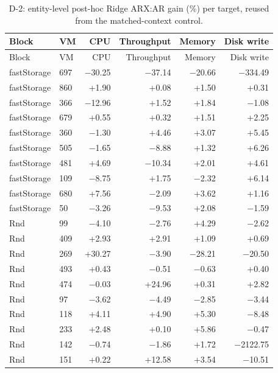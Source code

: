 \documentclass[a4paper,11pt]{article}
\begin{document}
\normalsize\setlength{\tabcolsep}{4pt}
\small
\setlength{\tabcolsep}{3pt}
\begin{longtable}{@{}llrrrr@{}}
\caption{D-2: entity-level post-hoc Ridge ARX:AR gain (\%) per target, reused from the matched-context control.}\label{tab:supp-t2-d2}\\
\toprule
Block & VM & CPU & Throughput & Memory & Disk write \\
\midrule
\endfirsthead
\toprule
Block & VM & CPU & Throughput & Memory & Disk write \\
\midrule
\endhead
\bottomrule
\endfoot
fastStorage & 697 & $-$30.25 & $-$37.14 & $-$20.66 & $-$334.49 \\
fastStorage & 860 & +1.90 & +0.08 & +1.50 & +0.31 \\
fastStorage & 366 & $-$12.96 & +1.52 & +1.84 & $-$1.08 \\
fastStorage & 679 & +0.55 & +0.32 & +1.51 & +2.25 \\
fastStorage & 360 & $-$1.30 & +4.46 & +3.07 & +5.45 \\
fastStorage & 505 & $-$1.65 & $-$8.88 & +1.32 & +6.26 \\
fastStorage & 481 & +4.69 & $-$10.34 & +2.01 & +4.61 \\
fastStorage & 109 & $-$8.75 & +1.75 & $-$2.32 & +6.14 \\
fastStorage & 680 & +7.56 & $-$2.09 & +3.62 & +1.16 \\
fastStorage & 50 & $-$3.26 & $-$9.53 & +2.08 & $-$1.59 \\
Rnd & 99 & $-$4.10 & $-$2.76 & +4.29 & $-$2.62 \\
Rnd & 409 & +2.93 & +2.91 & +1.09 & +0.69 \\
Rnd & 269 & +30.27 & $-$3.90 & $-$28.21 & $-$20.50 \\
Rnd & 493 & +0.43 & $-$0.51 & $-$0.63 & +0.40 \\
Rnd & 474 & $-$0.03 & +24.96 & +0.31 & +2.82 \\
Rnd & 97 & $-$3.62 & $-$4.49 & $-$2.85 & $-$3.44 \\
Rnd & 118 & +4.11 & +4.90 & +5.30 & $-$8.48 \\
Rnd & 233 & +2.48 & +0.10 & +5.86 & $-$0.47 \\
Rnd & 142 & $-$0.74 & $-$1.86 & +1.72 & $-$2122.75 \\
Rnd & 151 & +0.22 & +12.58 & +3.54 & $-$10.51 \\
\end{longtable}
\normalsize\setlength{\tabcolsep}{4pt}
\small
\setlength{\tabcolsep}{3pt}
\end{document}
